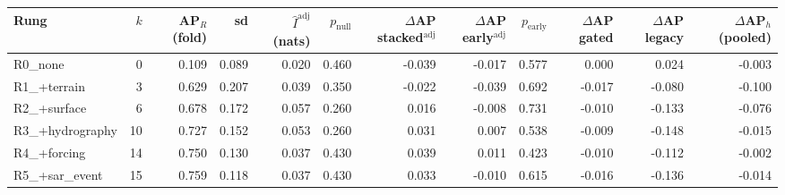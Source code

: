 \begin{tabular}{lrrrrrrrrrrr}
\toprule
Rung & $k$ & AP$_R$ (fold) & sd & $\hat I^{\mathrm{adj}}$ (nats) & $p_{\mathrm{null}}$ & $\Delta$AP stacked$^{\mathrm{adj}}$ & $\Delta$AP early$^{\mathrm{adj}}$ & $p_{\mathrm{early}}$ & $\Delta$AP gated & $\Delta$AP legacy & $\Delta$AP$_h$ (pooled) \\
\midrule
R0\_none & 0 & 0.109 & 0.089 & 0.020 & 0.460 & -0.039 & -0.017 & 0.577 & 0.000 & 0.024 & -0.003 \\
R1\_+terrain & 3 & 0.629 & 0.207 & 0.039 & 0.350 & -0.022 & -0.039 & 0.692 & -0.017 & -0.080 & -0.100 \\
R2\_+surface & 6 & 0.678 & 0.172 & 0.057 & 0.260 & 0.016 & -0.008 & 0.731 & -0.010 & -0.133 & -0.076 \\
R3\_+hydrography & 10 & 0.727 & 0.152 & 0.053 & 0.260 & 0.031 & 0.007 & 0.538 & -0.009 & -0.148 & -0.015 \\
R4\_+forcing & 14 & 0.750 & 0.130 & 0.037 & 0.430 & 0.039 & 0.011 & 0.423 & -0.010 & -0.112 & -0.002 \\
R5\_+sar\_event & 15 & 0.759 & 0.118 & 0.037 & 0.430 & 0.033 & -0.010 & 0.615 & -0.016 & -0.136 & -0.014 \\
\bottomrule
\end{tabular}

